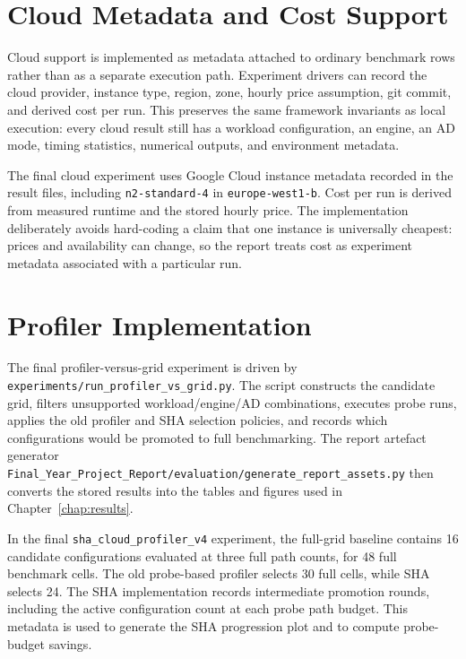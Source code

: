 \section{Cloud Metadata and Cost Support}
\label{sec:impl-cloud}

Cloud support is implemented as metadata attached to ordinary benchmark rows
rather than as a separate execution path. Experiment drivers can record the
cloud provider, instance type, region, zone, hourly price assumption, git
commit, and derived cost per run. This preserves the same framework invariants
as local execution: every cloud result still has a workload configuration, an
engine, an AD mode, timing statistics, numerical outputs, and environment
metadata.

The final cloud experiment uses Google Cloud instance metadata recorded in the
result files, including \texttt{n2-standard-4} in
\texttt{europe-west1-b}. Cost per run is derived from measured runtime and the
stored hourly price. The implementation deliberately avoids hard-coding a claim
that one instance is universally cheapest: prices and availability can change,
so the report treats cost as experiment metadata associated with a particular
run.

\section{Profiler Implementation}
\label{sec:impl-profiler}

The final profiler-versus-grid experiment is driven by
\texttt{experiments/run\_profiler\_vs\_grid.py}. The script constructs the
candidate grid, filters unsupported workload/engine/AD combinations, executes
probe runs, applies the old profiler and SHA selection policies, and records
which configurations would be promoted to full benchmarking. The report
artefact generator
\texttt{Final\_Year\_Project\_Report/evaluation/generate\_report\_assets.py}
then converts the stored results into the tables and figures used in
Chapter~\ref{chap:results}.

In the final \texttt{sha\_cloud\_profiler\_v4} experiment, the full-grid
baseline contains 16 candidate configurations evaluated at three full path
counts, for 48 full benchmark cells. The old probe-based profiler selects 30
full cells, while SHA selects 24. The SHA implementation records intermediate
promotion rounds, including the active configuration count at each probe path
budget. This metadata is used to generate the SHA progression plot and to
compute probe-budget savings.

